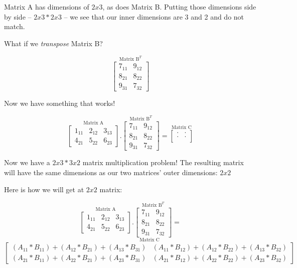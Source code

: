 \documentclass[
  letterpaper,
]{krantz}
\begin{document}
Matrix A has dimensions of \(2x3\), as does Matrix B. Putting those
dimensions side by side -- \(2x3 * 2x3\) -- we see that our inner
dimensions are 3 and 2 and do not match.

What if we \emph{transpose} Matrix B?

\[
\stackrel{\mbox{Matrix B}^T}{
\begin{bmatrix}
7_{11} & 9_{12} \\ 
8_{21}& 8_{22}\\
9_{31} & 7_{32}
\end{bmatrix} 
}
\]

Now we have something that works!

\[
\stackrel{\mbox{Matrix A}}{
\begin{bmatrix}
1_{11} & 2_{12} & 3_{13}\\
4_{21} & 5_{22} & 6_{23}
\end{bmatrix}
}
.
\stackrel{\mbox{Matrix B}^T}{
\begin{bmatrix}
7_{11} & 9_{12} \\ 
8_{21}& 8_{22}\\
9_{31} & 7_{32}
\end{bmatrix} 
}
=
\stackrel{\mbox{Matrix C}}{
\begin{bmatrix}
. & . \\
. & . \\
\end{bmatrix}
}
\]

Now we have a \(2x3 * 3x2\) matrix multiplication problem! The resulting
matrix will have the same dimensions as our two matrices' outer
dimensions: \(2x2\)

Here is how we will get at \(2x2\) matrix:

\[
\stackrel{\mbox{Matrix A}}{
\begin{bmatrix}
1_{11} & 2_{12} & 3_{13}\\
4_{21} & 5_{22} & 6_{23}
\end{bmatrix}
}
.
\stackrel{\mbox{Matrix B}^T}{
\begin{bmatrix}
7_{11} & 9_{12} \\ 
8_{21}& 8_{22}\\
9_{31} & 7_{32}
\end{bmatrix} 
}
=
\] \[
\stackrel{\mbox{Matrix C}}{
\begin{bmatrix}
(A_{11}*B_{11})+(A_{12}*B_{21})+(A_{13}*B_{31}) & (A_{11}*B_{12})+(A_{12}*B_{22})+(A_{13}*B_{32}) \\
(A_{21}*B_{11})+(A_{22}*B_{21})+(A_{23}*B_{31}) & (A_{21}*B_{12})+(A_{22}*B_{22})+(A_{23}*B_{32})
\end{bmatrix} 
}
\]
\end{document}
